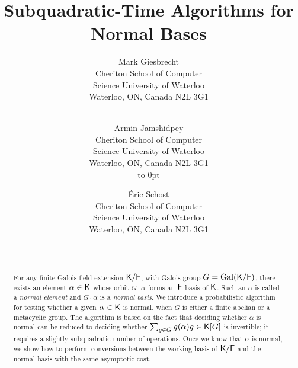 \contact{}%
\submitted{}%
\title{Subquadratic-Time Algorithms for Normal Bases}%
\titlehead{Normal Bases}%
\author{
Mark Giesbrecht \\
Cheriton School of Computer\\ Science
University of Waterloo\\ 
Waterloo, ON, Canada  N2L 3G1 \\
\\
\and 
Armin Jamshidpey\\
Cheriton School of Computer\\ Science
University of Waterloo\\ 
Waterloo, ON, Canada  N2L 3G1 \\
\hbox to 0pt{}\\
\and 
\'Eric Schost \\
Cheriton School of Computer\\ Science
University of Waterloo\\ 
Waterloo, ON, Canada  N2L 3G1 \\
\\
\\
}
\begin{abstract}
  For any finite Galois field extension ${\mathsf{K}}/{\mathsf{F}}$, with Galois group $G
  = \mathrm{Gal}({\mathsf{K}}/{\mathsf{F}})$, there exists an element $\alpha \in {\mathsf{K}}$
  whose orbit $G\cdot\alpha$ forms an ${\mathsf{F}}$-basis of ${\mathsf{K}}$. Such an
  $\alpha$ is called a \emph{normal element} and $G\cdot\alpha$ is a
  \emph{normal basis}. We introduce a probabilistic algorithm for
  testing whether a given $\alpha \in {\mathsf{K}}$ is normal, when $G$ is
  either a finite abelian or a metacyclic group. The algorithm is
  based on the fact that deciding whether $\alpha$ is normal can be
  reduced to deciding whether $\sum_{g \in G} g(\alpha)g \in {\mathsf{K}}[G]$ is
  invertible; it requires a slightly subquadratic number of
  operations. Once we know that $\alpha$ is normal, we show how to
  perform conversions between the working basis of ${\mathsf{K}}/{\mathsf{F}}$ and the
  normal basis with the same asymptotic cost.
\end{abstract}

